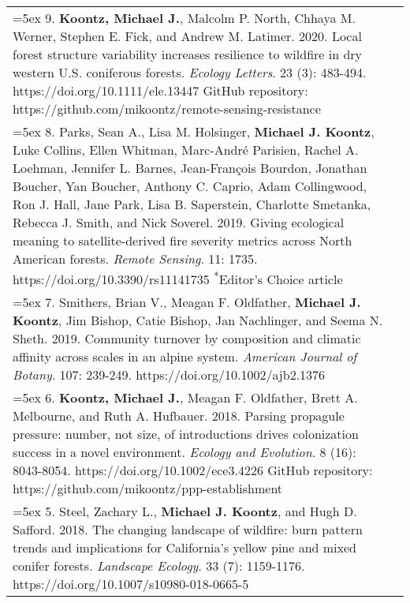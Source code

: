 \begin{longtable}{@{} >{\raggedright}p{6.10in} >{\raggedleft}X @{}}
\hangindent=5ex 9. \textbf{Koontz, Michael J.}, Malcolm P. North, Chhaya M. Werner, Stephen E. Fick, and Andrew M. Latimer. 2020. Local forest structure variability increases resilience to wildfire in dry western U.S. coniferous forests. \emph{Ecology Letters}. 23 (3): 483-494. https://doi.org/10.1111/ele.13447 
\newline GitHub repository: https://github.com/mikoontz/remote-sensing-resistance & \tabularnewline

\hangindent=5ex 8. Parks, Sean A., Lisa M. Holsinger, \textbf{Michael J. Koontz}, Luke Collins, Ellen Whitman, Marc-Andr\'e Parisien, Rachel A. Loehman, Jennifer L. Barnes, Jean-Fran\c{c}ois Bourdon, Jonathan Boucher, Yan Boucher, Anthony C. Caprio, Adam Collingwood, Ron J. Hall, Jane Park, Lisa B. Saperstein, Charlotte Smetanka, Rebecca J. Smith, and Nick Soverel. 2019. Giving ecological meaning to satellite-derived fire severity metrics across North American forests. \emph{Remote Sensing}. 11: 1735. https://doi.org/10.3390/rs11141735 \newline \textsuperscript{*}Editor's Choice article & \tabularnewline

\hangindent=5ex 7. Smithers, Brian V., Meagan F. Oldfather, \textbf{Michael J. Koontz}, Jim Bishop, Catie Bishop, Jan Nachlinger, and Seema N. Sheth. 2019. Community turnover by composition and climatic affinity across scales in an alpine system. \emph{American Journal of Botany}. 107: 239-249. https://doi.org/10.1002/ajb2.1376 & \tabularnewline

\hangindent=5ex 6. \textbf{Koontz, Michael J.}, Meagan F. Oldfather, Brett A. Melbourne, and Ruth A. Hufbauer. 2018. Parsing propagule pressure: number, not size, of introductions drives colonization success in a novel environment. \emph{Ecology and Evolution}. 8 (16): 8043-8054. https://doi.org/10.1002/ece3.4226 
\newline GitHub repository: https://github.com/mikoontz/ppp-establishment & \tabularnewline

\hangindent=5ex 5. Steel, Zachary L., \textbf{Michael J. Koontz}, and Hugh D. Safford. 2018. The changing landscape of wildfire: burn pattern trends and implications for California's yellow pine and mixed conifer forests. \emph{Landscape Ecology}. 33 (7): 1159-1176. https://doi.org/10.1007/s10980-018-0665-5 &  \tabularnewline


\end{longtable}
